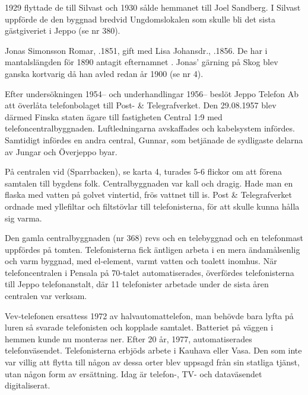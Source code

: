 1929 flyttade de till Silvast och 1930 sålde hemmanet till Joel Sandberg. I Silvast uppförde de den byggnad bredvid Ungdomslokalen som skulle bli det sista gästgiveriet i Jeppo (se nr 380).


Jonas Simonsson Romar, .1851, gift med Lisa Johansdr., .1856. De har i mantalslängden för 1890 antagit efternamnet . Jonas' gärning på Skog blev ganska kortvarig då han avled redan år 1900 (se nr 4).






Efter undersökningen 1954-- och underhandlingar 1956-- beslöt	Jeppo Telefon Ab att överlåta telefonbolaget till Post- \& Telegrafverket. Den 29.08.1957 blev därmed Finska staten ägare till fastigheten Central 1:9 med telefoncentralbyggnaden. Luftledningarna avskaffades och kabelsystem infördes. Samtidigt infördes en andra central, Gunnar, som betjänade de sydligaste delarna av Jungar och Överjeppo byar.

På centralen vid  (Sparrbacken), se karta 4, turades 5-6 flickor om att förena samtalen till bygdens folk. Centralbyggnaden var kall och dragig. Hade man en flaska med vatten på golvet vintertid, frös vattnet till is. Post \& Telegrafverket ordnade med yllefiltar och filtstövlar till telefonisterna, för att skulle kunna hålla sig varma.

Den gamla centralbyggnaden (nr 368) revs och en telebyggnad och en telefonmast uppfördes på tomten. Telefonisterna fick äntligen arbeta i en mera ändamålsenlig och varm byggnad, med el-element, varmt vatten och toalett inomhus. När telefoncentralen i Pensala på 70-talet automatiserades, överfördes telefonisterna till Jeppo telefonanstalt, där 11 telefonister arbetade under de sista åren centralen var verksam.

Vev-telefonen ersattess 1972 av halvautomattelefon, man behövde bara lyfta på luren så svarade telefonisten och kopplade samtalet. Batteriet på väggen i hemmen kunde nu monteras ner. Efter 20 år, 1977, automatiserades telefonväsendet. Telefonisterna erbjöds arbete i Kauhava eller Vasa. Den som inte var villig att flytta till någon av dessa orter blev uppsagd från sin statliga tjänst, utan någon form av ersättning. Idag är telefon-, TV- och dataväsendet digitaliserat.


